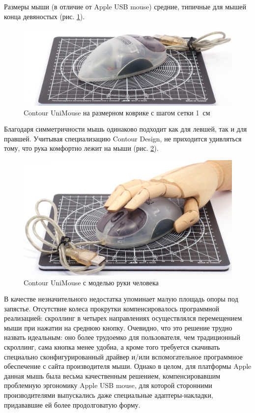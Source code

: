 \documentclass[11pt, a4paper]{article}
\begin{document}
Размеры мыши (в отличие от Apple USB mouse) средние, типичные для мышей конца девяностых (рис. \ref{fig:ContourUniMouseSize}).

\begin{figure}[h]
    \centering
    \includegraphics[scale=0.5]{1999_contour_unimouse/size_30.jpg}
    \caption{Contour UniMouse на размерном коврике с шагом сетки 1~см}
    \label{fig:ContourUniMouseSize}
\end{figure}

Благодаря симметричности мышь одинаково подходит как для левшей, так и для правшей. Учитывая специализацию Contour Design, не приходится удивляться тому, что рука комфортно лежит на мыши (рис. \ref{fig:ContourUniMouseHand}).

\begin{figure}[h]
    \centering
    \includegraphics[scale=0.55]{1999_contour_unimouse/hand_30.jpg}
    \caption{Contour UniMouse с моделью руки человека}
    \label{fig:ContourUniMouseHand}
\end{figure}

В качестве незначительного недостатка \cite{mactoday} упоминает малую площадь опоры под запястье. Отсутствие колеса прокрутки компенсировалось программной реализацией: скроллинг в четырех направлениях осуществлялся перемещением мыши при нажатии на среднюю кнопку. Очевидно, что это решение трудно назвать идеальным: оно более трудоемко для пользователя, чем традиционный скроллинг, сама кнопка менее удобна, а кроме того требуется скачивать специально сконфигурированный драйвер и/или вспомогательное программное обеспечение с сайта производителя мыши. Однако в целом, для платформы Apple данная мышь была весьма качественным решением, компенсировавшим проблемную эргономику Apple USB mouse, для которой сторонними производителями выпускались даже специальные адаптеры-накладки, придававшие ей более продолговатую форму.
\end{document}
